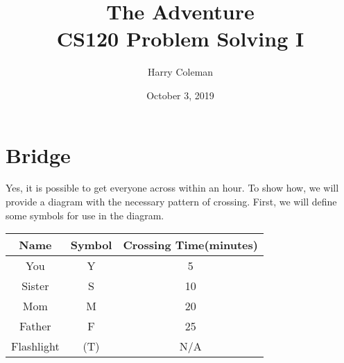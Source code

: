 \documentclass[12pt]{article}
\begin{document}
 
\title{The Adventure\\
    \large CS120 Problem Solving I}
\author{Harry Coleman}
\date{October 3, 2019}

\maketitle

\section*{Bridge}
\begin{comment}
\fbox{
    \parbox{\textwidth}{
        You only remembered to pack one flashlight, which has a weak beam, so whenever two people cross, they are constrained to walk together, at the speed of the slower person. You can cross the bridge in 5 minutes. Your sister, Maria, can cross it in 10 minutes. Your mom needs 20 minutes, and your father needs 25 minutes. You estimate that you need to get everyone across safely in one hour to escape the wild animals chasing you. Can you do it?
    }
}
\\
\end{comment}

Yes, it is possible to get everyone across within an hour. To show how, we will provide a diagram with the necessary pattern of crossing. First, we will define some symbols for use in the diagram.

\begin{center}
    \begin{tabular}{c|c|c}
         Name & Symbol & Crossing Time(minutes)\\
         \hline
         You & Y & 5\\
         Sister & S & 10\\
         Mom & M & 20\\
         Father & F & 25\\
         Flashlight & (T) & N/A
    \end{tabular}
\end{center}
\end{document}
